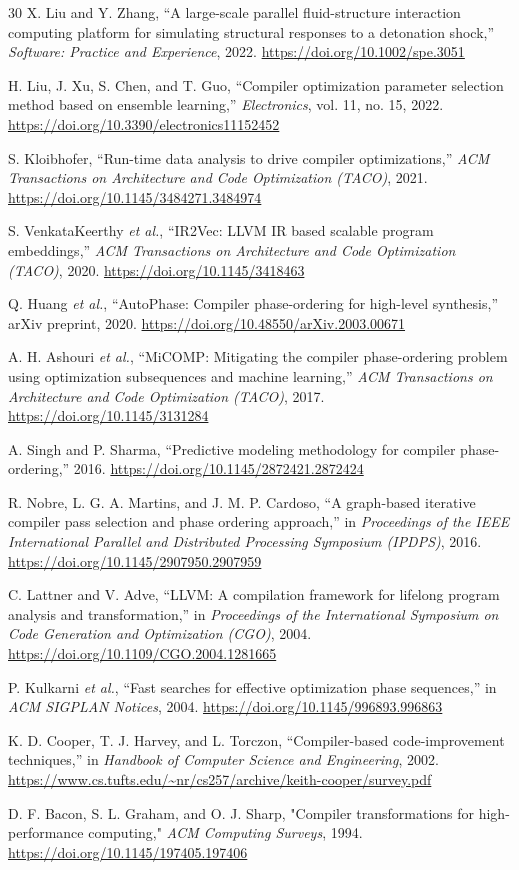 \documentclass[conference]{IEEEtran}
\begin{document}
\begin{thebibliography}{30}
X. Liu and Y. Zhang, 
``A large-scale parallel fluid-structure interaction computing platform for simulating structural responses to a detonation shock,'' 
\textit{Software: Practice and Experience}, 2022.
\url{https://doi.org/10.1002/spe.3051}

H. Liu, J. Xu, S. Chen, and T. Guo, 
``Compiler optimization parameter selection method based on ensemble learning,'' 
\textit{Electronics}, vol. 11, no. 15, 2022.
\url{https://doi.org/10.3390/electronics11152452}

S. Kloibhofer, 
``Run-time data analysis to drive compiler optimizations,'' 
\textit{ACM Transactions on Architecture and Code Optimization (TACO)}, 2021.
\url{https://doi.org/10.1145/3484271.3484974}

S. VenkataKeerthy \textit{et al.}, 
``IR2Vec: LLVM IR based scalable program embeddings,'' 
\textit{ACM Transactions on Architecture and Code Optimization (TACO)}, 2020.
\url{https://doi.org/10.1145/3418463}

Q. Huang \textit{et al.}, 
``AutoPhase: Compiler phase-ordering for high-level synthesis,'' 
arXiv preprint, 2020.
\url{https://doi.org/10.48550/arXiv.2003.00671}

A. H. Ashouri \textit{et al.}, 
``MiCOMP: Mitigating the compiler phase-ordering problem using optimization subsequences and machine learning,'' 
\textit{ACM Transactions on Architecture and Code Optimization (TACO)}, 2017.
\url{https://doi.org/10.1145/3131284}

A. Singh and P. Sharma, 
``Predictive modeling methodology for compiler phase-ordering,'' 2016.
\url{https://doi.org/10.1145/2872421.2872424}

R. Nobre, L. G. A. Martins, and J. M. P. Cardoso, 
``A graph-based iterative compiler pass selection and phase ordering approach,'' 
in \textit{Proceedings of the IEEE International Parallel and Distributed Processing Symposium (IPDPS)}, 2016.
\url{https://doi.org/10.1145/2907950.2907959}

C. Lattner and V. Adve, 
``LLVM: A compilation framework for lifelong program analysis and transformation,'' 
in \textit{Proceedings of the International Symposium on Code Generation and Optimization (CGO)}, 2004.
\url{https://doi.org/10.1109/CGO.2004.1281665}

P. Kulkarni \textit{et al.}, 
``Fast searches for effective optimization phase sequences,'' 
in \textit{ACM SIGPLAN Notices}, 2004.
\url{https://doi.org/10.1145/996893.996863}

K. D. Cooper, T. J. Harvey, and L. Torczon, 
``Compiler-based code-improvement techniques,'' 
in \textit{Handbook of Computer Science and Engineering}, 2002.
\url{https://www.cs.tufts.edu/~nr/cs257/archive/keith-cooper/survey.pdf}

D. F. Bacon, S. L. Graham, and O. J. Sharp,
"Compiler transformations for high-performance computing," \textit{ACM Computing Surveys}, 1994.
\url{https://doi.org/10.1145/197405.197406}

\end{thebibliography}
\end{document}
